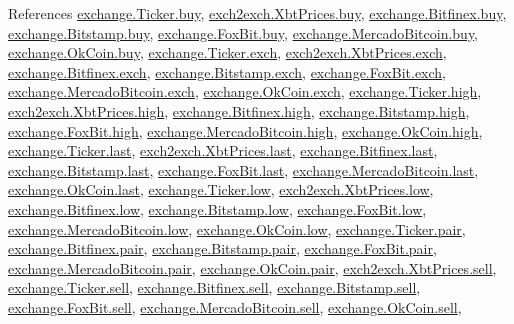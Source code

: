 References \hyperlink{exchange_8py_source_l00058}{exchange.\+Ticker.\+buy}, \hyperlink{exch2exch_8py_source_l00059}{exch2exch.\+Xbt\+Prices.\+buy}, \hyperlink{exchange_8py_source_l00331}{exchange.\+Bitfinex.\+buy}, \hyperlink{exchange_8py_source_l00400}{exchange.\+Bitstamp.\+buy}, \hyperlink{exchange_8py_source_l00472}{exchange.\+Fox\+Bit.\+buy}, \hyperlink{exchange_8py_source_l00534}{exchange.\+Mercado\+Bitcoin.\+buy}, \hyperlink{exchange_8py_source_l00599}{exchange.\+Ok\+Coin.\+buy}, \hyperlink{exchange_8py_source_l00055}{exchange.\+Ticker.\+exch}, \hyperlink{exch2exch_8py_source_l00064}{exch2exch.\+Xbt\+Prices.\+exch}, \hyperlink{exchange_8py_source_l00325}{exchange.\+Bitfinex.\+exch}, \hyperlink{exchange_8py_source_l00397}{exchange.\+Bitstamp.\+exch}, \hyperlink{exchange_8py_source_l00465}{exchange.\+Fox\+Bit.\+exch}, \hyperlink{exchange_8py_source_l00531}{exchange.\+Mercado\+Bitcoin.\+exch}, \hyperlink{exchange_8py_source_l00596}{exchange.\+Ok\+Coin.\+exch}, \hyperlink{exchange_8py_source_l00060}{exchange.\+Ticker.\+high}, \hyperlink{exch2exch_8py_source_l00061}{exch2exch.\+Xbt\+Prices.\+high}, \hyperlink{exchange_8py_source_l00333}{exchange.\+Bitfinex.\+high}, \hyperlink{exchange_8py_source_l00402}{exchange.\+Bitstamp.\+high}, \hyperlink{exchange_8py_source_l00474}{exchange.\+Fox\+Bit.\+high}, \hyperlink{exchange_8py_source_l00536}{exchange.\+Mercado\+Bitcoin.\+high}, \hyperlink{exchange_8py_source_l00601}{exchange.\+Ok\+Coin.\+high}, \hyperlink{exchange_8py_source_l00062}{exchange.\+Ticker.\+last}, \hyperlink{exch2exch_8py_source_l00063}{exch2exch.\+Xbt\+Prices.\+last}, \hyperlink{exchange_8py_source_l00335}{exchange.\+Bitfinex.\+last}, \hyperlink{exchange_8py_source_l00404}{exchange.\+Bitstamp.\+last}, \hyperlink{exchange_8py_source_l00476}{exchange.\+Fox\+Bit.\+last}, \hyperlink{exchange_8py_source_l00538}{exchange.\+Mercado\+Bitcoin.\+last}, \hyperlink{exchange_8py_source_l00603}{exchange.\+Ok\+Coin.\+last}, \hyperlink{exchange_8py_source_l00061}{exchange.\+Ticker.\+low}, \hyperlink{exch2exch_8py_source_l00062}{exch2exch.\+Xbt\+Prices.\+low}, \hyperlink{exchange_8py_source_l00334}{exchange.\+Bitfinex.\+low}, \hyperlink{exchange_8py_source_l00403}{exchange.\+Bitstamp.\+low}, \hyperlink{exchange_8py_source_l00475}{exchange.\+Fox\+Bit.\+low}, \hyperlink{exchange_8py_source_l00537}{exchange.\+Mercado\+Bitcoin.\+low}, \hyperlink{exchange_8py_source_l00602}{exchange.\+Ok\+Coin.\+low}, \hyperlink{exchange_8py_source_l00056}{exchange.\+Ticker.\+pair}, \hyperlink{exchange_8py_source_l00326}{exchange.\+Bitfinex.\+pair}, \hyperlink{exchange_8py_source_l00398}{exchange.\+Bitstamp.\+pair}, \hyperlink{exchange_8py_source_l00466}{exchange.\+Fox\+Bit.\+pair}, \hyperlink{exchange_8py_source_l00532}{exchange.\+Mercado\+Bitcoin.\+pair}, \hyperlink{exchange_8py_source_l00597}{exchange.\+Ok\+Coin.\+pair}, \hyperlink{exch2exch_8py_source_l00058}{exch2exch.\+Xbt\+Prices.\+sell}, \hyperlink{exchange_8py_source_l00059}{exchange.\+Ticker.\+sell}, \hyperlink{exchange_8py_source_l00332}{exchange.\+Bitfinex.\+sell}, \hyperlink{exchange_8py_source_l00401}{exchange.\+Bitstamp.\+sell}, \hyperlink{exchange_8py_source_l00473}{exchange.\+Fox\+Bit.\+sell}, \hyperlink{exchange_8py_source_l00535}{exchange.\+Mercado\+Bitcoin.\+sell}, \hyperlink{exchange_8py_source_l00600}{exchange.\+Ok\+Coin.\+sell}, 
